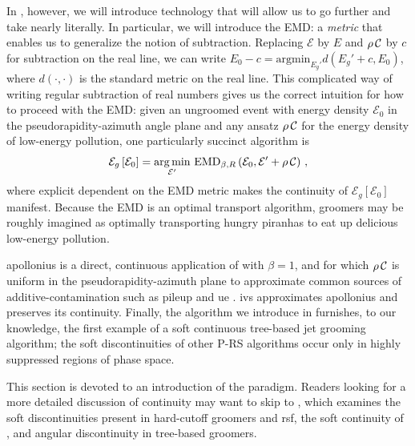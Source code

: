 In , however, we will introduce technology that will allow us to go further and take  nearly literally.
%
In particular, we will introduce the EMD:
%
a \emph{metric} that enables us to generalize the notion of subtraction.
%
Replacing \(\mathcal{E}\) by \(E\) and \(\rho\,\mathcal{C}\) by \(c\) for subtraction on the real line, we can write \(E_0 - c = \text{argmin}_{E_g'}d(E_g' + c, E_0)\), where \(d(\cdot,\cdot)\) is the standard metric on the real line.
%
This complicated way of writing regular subtraction of real numbers gives us the correct intuition for how to proceed with the EMD:
%
given an ungroomed event with energy density \(\mathcal{E}_{0}\) in the pseudorapidity-azimuth angle plane and any ansatz \(\rho\,\mathcal{C}\) for the energy density of low-energy pollution, one particularly succinct \PIRANHA{} algorithm is
%
\begin{align}
    \mathcal{E}_g\left[\mathcal{E}_0\right]
    =
    \underset{\mathcal{E}'}{\arg \min}\ {\rm EMD}_{\beta, R}
    \left(\mathcal{E}_0, \mathcal{E}' + \rhoC\right)
    \label{eq:simple_piranha_intro}
    \,,
\end{align}
where explicit dependent on the EMD metric makes the continuity of \(\mathcal{E}_g\left[\mathcal{E}_0\right]\) manifest.
%
Because the EMD is an optimal transport algorithm, \PIRANHA{} groomers may be roughly imagined as optimally transporting hungry piranhas to eat up delicious low-energy pollution.

\gls{apollonius} is a direct, continuous application of  with \(\beta = 1\), and for which \(\rho\,\mathcal{C}\) is uniform in the pseudorapidity-azimuth plane to approximate common sources of \gls{additive-contamination} such as \gls{pileup} and \gls{ue} \cite{Soyez:2018opl,Monk:2018clo,Sjostrand:1987su,Sjostrand:2014zea,Dasgupta:2007wa,Kirchgaesser:2020poq,Moraes:2007rq,CDF:2015txs,Larkoski:2021hee,Baron:2020xoi,Marzani:2017kqd}.
%
\gls{ivs} approximates \gls{apollonius} and preserves its continuity.
%
Finally, the  algorithm we introduce in  furnishes, to our knowledge, the first example of a soft continuous tree-based jet grooming algorithm;
%
the soft discontinuities of other P-RS algorithms occur only in highly suppressed regions of phase space.


This section is devoted to an introduction of the \PIRANHA{} paradigm.
%
Readers looking for a more detailed discussion of continuity may want to skip to , which examines the soft discontinuities present in hard-cutoff groomers and \gls{rsf}, the soft continuity of , and angular discontinuity in tree-based groomers.


